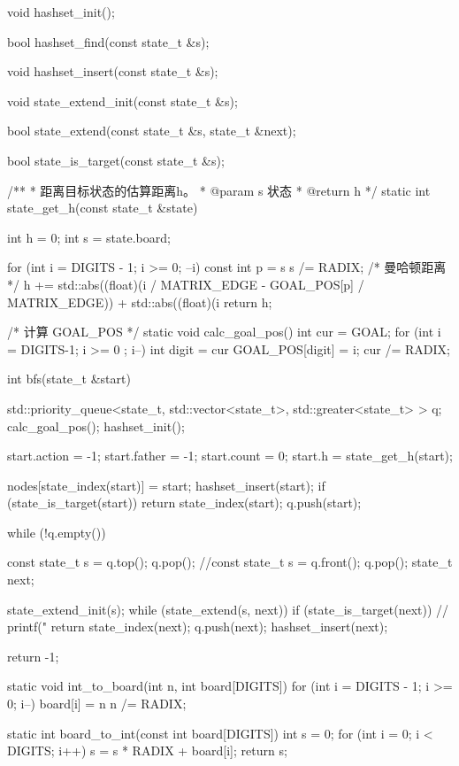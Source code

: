 \begin{Codex}[label=eight_digits_astar.c]
void hashset_init();

bool hashset_find(const state_t &s);

void hashset_insert(const state_t &s);

void state_extend_init(const state_t &s);

bool state_extend(const state_t &s, state_t &next);

bool state_is_target(const state_t &s);

/**
 * 距离目标状态的估算距离h。
 * @param s 状态
 * @return h
 */
static int state_get_h(const state_t &state) {
    int h = 0;
    int s = state.board;

    for (int i = DIGITS - 1; i >= 0; --i) {
        const int p = s %
        s /= RADIX;
        /* 曼哈顿距离 */
        h += std::abs((float)(i / MATRIX_EDGE - GOAL_POS[p] / MATRIX_EDGE)) +
                std::abs((float)(i %
    }
    return h;
}

/* 计算 GOAL_POS */
static void calc_goal_pos() {
    int cur = GOAL;
    for (int i = DIGITS-1; i >= 0 ; i--) {
        int digit = cur %
        GOAL_POS[digit] = i;
        cur /= RADIX;
    }
}

int bfs(state_t &start) {
    std::priority_queue<state_t, std::vector<state_t>,
                                 std::greater<state_t> > q;
    calc_goal_pos();
    hashset_init();

    start.action = -1;
    start.father = -1;
    start.count = 0;
    start.h = state_get_h(start);

    nodes[state_index(start)] = start;
    hashset_insert(start);
    if (state_is_target(start))
        return state_index(start);
    q.push(start);

    while (!q.empty()) {
        const state_t s = q.top(); q.pop();
        //const state_t s = q.front(); q.pop();
        state_t next;

        state_extend_init(s);
        while (state_extend(s, next)) {
            if (state_is_target(next)) {
                // printf("%
                return state_index(next);
            }
            q.push(next);
            hashset_insert(next);
        }
    }
    return -1;
}

static void int_to_board(int n, int board[DIGITS]) {
    for (int i = DIGITS - 1; i >= 0; i--) {
        board[i] = n %
        n /= RADIX;
    }
}

static int board_to_int(const int board[DIGITS]) {
    int s = 0;
    for (int i = 0; i < DIGITS; i++)
        s = s * RADIX + board[i];
    return s;
}


\end{Codex}
